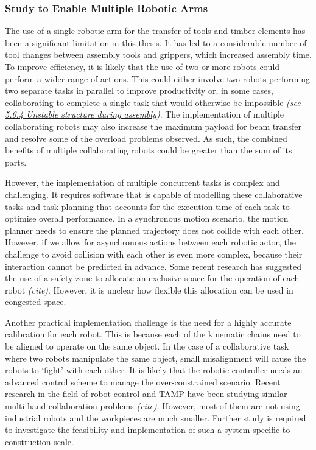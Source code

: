 \documentclass[11pt]{book}
\begin{document}
\subsubsection{Study to Enable Multiple Robotic Arms}

The use of a single robotic arm for the transfer of tools and timber elements has been a significant limitation in this thesis. It has led to a considerable number of tool changes between assembly tools and grippers, which increased assembly time. To improve efficiency, it is likely that the use of two or more robots could perform a wider range of actions. This could either involve two robots performing two separate tasks in parallel to improve productivity or, in some cases, collaborating to complete a single task that would otherwise be impossible \textit{(see \uline{5.6.4 Unstable structure during assembly})}. The implementation of multiple collaborating robots may also increase the maximum payload for beam transfer and resolve some of the overload problems observed. As such, the combined benefits of multiple collaborating robots could be greater than the sum of its parts.

However, the implementation of multiple concurrent tasks is complex and challenging. It requires software that is capable of modelling these collaborative tasks and task planning that accounts for the execution time of each task to optimise overall performance. In a synchronous motion scenario, the motion planner needs to ensure the planned trajectory does not collide with each other. However, if we allow for asynchronous actions between each robotic actor, the challenge to avoid collision with each other is even more complex, because their interaction cannot be predicted in advance. Some recent research has suggested the use of a safety zone to allocate an exclusive space for the operation of each robot \textit{(cite)}. However, it is unclear how flexible this allocation can be used in congested space.

Another practical implementation challenge is the need for a highly accurate calibration for each robot. This is because each of the kinematic chains need to be aligned to operate on the same object. In the case of a collaborative task where two robots manipulate the same object, small misalignment will cause the robots to ‘fight’ with each other. It is likely that the robotic controller needs an advanced control scheme to manage the over-constrained scenario. Recent research in the field of robot control and TAMP have been studying similar multi-hand collaboration problems \textit{(cite)}. However, most of them are not using industrial robots and the workpieces are much smaller. Further study is required to investigate the feasibility and implementation of such a system specific to construction scale. 
\end{document}
